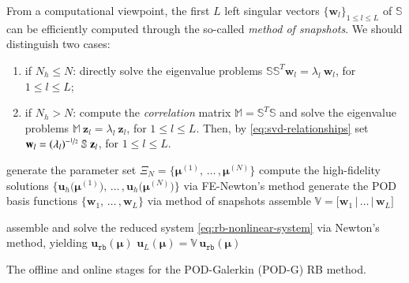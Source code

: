 \documentclass{elsarticle}
\numberwithin{equation}{section}
\theoremstyle{theorem}
\theoremstyle{definition}
\theoremstyle{remark}
\theoremstyle{proposition}
\numberwithin{figure}{section}
\newcommand{\bg}[1]{\boldsymbol{#1}}
\begin{document}
		\noindent From a computational viewpoint, the first $L$ left singular vectors $\big\lbrace \mathbf{w}_l \big\rbrace_{1 \leq l \leq L}$ of $\mathbb{S}$ can be efficiently computed through the so-called \emph{method of snapshots}. We should distinguish two cases:
		\begin{enumerate}[label=(\alph*)]
			\item if ${N_h} \leq N$: directly solve the eigenvalue problems $\mathbb{S} \mathbb{S}^T \mathbf{w}_l = \lambda_l ~ \mathbf{w}_l$, for $1 \leq l \leq L$;
			\item if ${N_h} > N$: compute the \emph{correlation} matrix $\mathbb{M} = \mathbb{S}^T \mathbb{S}$ and solve the eigenvalue problems $\mathbb{M} ~ \mathbf{z}_l = \lambda_l ~ \mathbf{z}_l$, for $1 \leq l \leq L$. Then, by \eqref{eq:svd-relationships} set $\mathbf{w}_l = (\lambda_l)^{-\nicefrac{1}{2}} ~ \mathbb{S} ~ \mathbf{z}_l$, for $1 \leq l \leq L$.
		\end{enumerate}
		
		\algrenewcommand\textproc{}
		
		\begin{algorithm}[t]	
			\begin{algorithmic}[1]
					\State generate the parameter set $\Xi_N = \big\lbrace \bg{\mu}^{(1)}, \, \ldots \, , \bg{\mu}^{(N)} \big\rbrace$
					\State compute the high-fidelity solutions $\big\lbrace \mathbf{u}_h \big( \bg{\mu}^{(1)} \big), \, \ldots \, , \mathbf{u}_h \big( \bg{\mu}^{(N)} \big) \big\rbrace$ via FE-Newton's method
					\State generate the POD basis functions $\big\lbrace \mathbf{w}_1, \, \ldots \, , \mathbf{w}_L \big\rbrace$ via method of snapshots
					\State assemble $\mathbb{V} = \big[ \mathbf{w}_1 \, \big| \, \ldots \, \big| \, \mathbf{w}_L \big]$
				\EndFunction
				
				\vspace*{0.3cm}
				
				\setcounter{ALG@line}{0}
				
				\Function{$\mathbf{u}_L (\bg{\mu}) = $ \textsc{PODG\_online}}{$\bg{\mu}$, $\mathbb{V}$}
					\State assemble and solve the reduced system \eqref{eq:rb-nonlinear-system} via Newton's method, yielding $\mathbf{u}_{\texttt{rb}} (\bg{\mu})$
					\State $\mathbf{u}_L (\bg{\mu}) = \mathbb{V} \, \mathbf{u}_{\texttt{rb}} (\bg{\mu})$
				\EndFunction
			\end{algorithmic}
			
			\caption{The offline and online stages for the POD-Galerkin (POD-G) RB method.}
			\label{alg:pod-galerkin}
		\end{algorithm}
		
\end{document}
